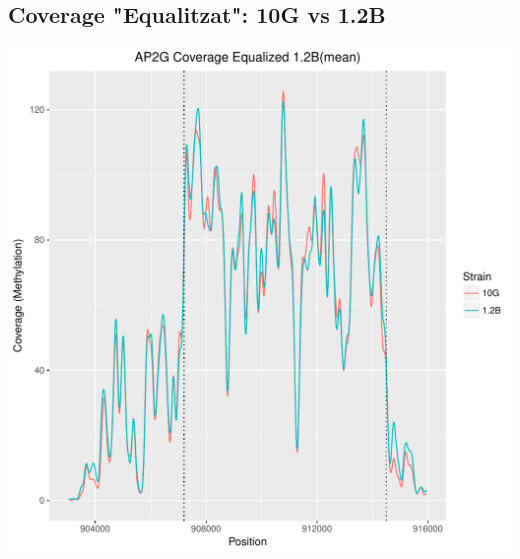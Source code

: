 \documentclass{article}\usepackage[]{graphicx}\usepackage[]{color}
\newenvironment{knitrout}{}{} %
\begin{document}
\subsection{Coverage "Equalitzat": 10G vs 1.2B}
\begin{knitrout}
\color{fgcolor}
\includegraphics[width=1\linewidth]{figure/plot_equalizedCov_10vs1_2-1} 

\end{knitrout}
\clearpage
\end{document}
